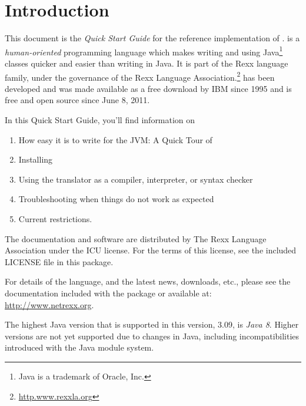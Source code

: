 \chapter{Introduction}
This document is the \emph{Quick Start Guide} for the reference implementation of
\nr{}. \nr{} is a \emph{human-oriented} programming language which makes
writing and using Java\footnote{Java is a trademark of Oracle, Inc.}
classes quicker and easier than writing in Java. It is part of the Rexx
language family, under the governance of the Rexx Language
Association.\footnote{\url{http.www.rexxla.org}} \nr{} has been
developed and was made available as a free download by IBM since 1995
and is free and open source since June 8, 2011.

In this Quick Start Guide, you’ll find information on
\begin{enumerate} 
\item How easy it is to write for the JVM: A Quick Tour of \nr{}
\item Installing \nr{} 
\item Using the \nr{} translator as a compiler, interpreter, or
  syntax checker 
\item Troubleshooting when things do not work as expected
\item Current restrictions.
\end{enumerate} 
The \nr{} documentation and software are distributed
by The Rexx Language Association under the \textsc{ICU} license. For
the terms of this license, see the included \textsc{LICENSE} file in
this package.

For details of the \nr{} language, and the latest news, downloads,
etc., please see the \nr{} documentation included with the package
or available at: \url{http://www.netrexx.org}.

\begin{shaded}\noindent
The highest Java version that is supported in this version, 3.09, is
\emph{Java 8}. Higher versions are not yet supported due to changes in
Java, including incompatibilities introduced with the Java module system.
\end{shaded}\indent
